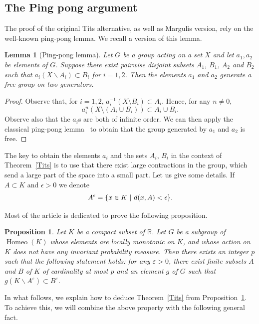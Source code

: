 \documentclass[10pt]{amsart}
\newtheorem{lemm}[theo]{Lemma}\newtheorem{prop}[theo]{Proposition}\newtheorem{coro}[theo]{Corollary}\newtheorem{conj}[theo]{Conjecture}
\theoremstyle{definition}\newtheorem{defi}[theo]{Definition}\newtheorem{rema}[theo]{Remark}\newtheorem{exam}[theo]{Example}\newtheorem{exem}[theo]{Example}\newtheorem{nota}[theo]{Notation}
\DeclareMathOperator{\Homeo}{Homeo}
\newcommand{\R}{\mathbb{R}}
\newcommand{\ep}{\varepsilon}
\let\originalleft\left
\let\originalright\right
\renewcommand{\left}{\mathopen{}\mathclose\bgroup\originalleft}
\renewcommand{\right}{\aftergroup\egroup\originalright}
\begin{document}
\subsection{The Ping pong argument} The proof of the original Tits alternative, as well as Margulis version, rely on the well-known ping-pong lemma. We recall a version of this lemma.

\begin{lemm}[Ping-pong lemma]
Let $G$ be a group acting on a set $X$ and let $a_1,a_2$ be elements of $G$. Suppose there exist pairwise disjoint subsets $A_1$, $B_1$, $A_2$ and $B_2$ such that $a_i(X\backslash A_i)\subset B_i$ for $i=1,2$. Then the elements $a_1$ and $a_2$ generate a free group on two generators.
\end{lemm}

\begin{proof}
Observe that, for $i=1,2$, $a_i^{-1}(X \setminus B_i) \subset A_i$. Hence, for any $n \neq 0$,
\[
a_i^{n}(X\setminus (A_{i} \cup B_{i})) \subset A_i \cup B_i.
\]
Observe also that the $a_i$s are both of infinite order. We can then apply the classical ping-pong lemma~\cite[p.~25]{dlH} to obtain that the group generated by $a_1$ and $a_2$ is free.
\end{proof}

The key to obtain the elements $a_i$ and the sets $A_i$, $B_i$ in the context of Theorem~\ref{Tits} is to use that there exist large contractions in the group, which send a large part of the space into a small part. Let us give some details. If $A\subset K$ and $\epsilon >0$ we denote
\[
A^{\epsilon}= \left\{ x \in K \ | \ d(x,A) < \epsilon \right\}.
\]

Most of the article is dedicated to prove the following proposition.

\begin{prop}\label{globalcontrcorollary}
Let $K$ be a compact subset of $\R$. Let $G$ be a subgroup of $\Homeo(K)$ whose elements are locally monotonic on $K$, and whose action on $K$ does not have any invariant probability measure. Then there exists an integer $p$ such that the following statement holds: for any $\ep>0$, there exist finite subsets $A$ and $B$ of $K$ of cardinality at most $p$ and an element $g$ of $G$ such that $g(K\backslash A^\ep)\subset B^\ep$.
\end{prop}

In what follows, we explain how to deduce Theorem~\ref{Tits} from Proposition~\ref{globalcontrcorollary}. To achieve this, we will combine the above property with the following general fact.
\end{document}
